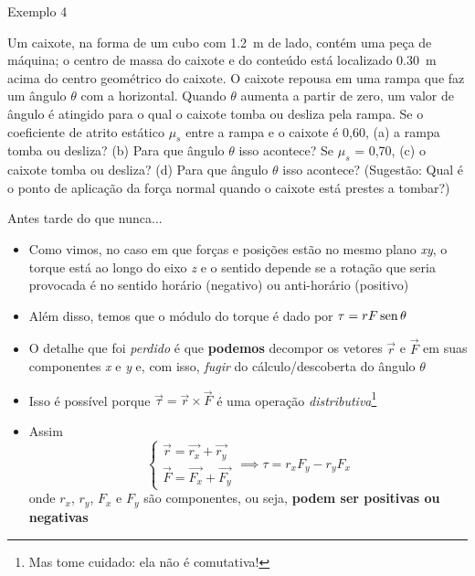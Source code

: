 
\begin{frame}{Exemplo 4}
    \begin{minipage}{\textwidth}
        Um caixote, na forma de um cubo com \SI{1,2}{m} de lado, contém uma peça de máquina; o centro de
        massa do caixote e do conteúdo está localizado \SI{0,30}{m} acima do centro geométrico do caixote. O caixote
        repousa em uma rampa que faz um ângulo \(\theta\) com a horizontal. Quando \(\theta\) aumenta a partir de zero, um
        valor de ângulo é atingido para o qual o caixote tomba ou desliza pela rampa. Se o coeficiente de atrito
        estático \(\mu_s\) entre a rampa e o caixote é 0,60, (a) a rampa tomba ou desliza? (b) Para que ângulo \(\theta\) isso
        acontece? Se \(\mu_s\) = 0,70, (c) o caixote tomba ou desliza? (d) Para que ângulo \(\theta\) isso acontece? (Sugestão:
        Qual é o ponto de aplicação da força normal quando o caixote está prestes a tombar?)
    \end{minipage}
\end{frame}

\begin{frame}{Antes tarde do que nunca...}
    \begin{itemize}
        \item Como vimos, no caso em que forças e posições estão no mesmo plano \textit{xy}, o torque
            está ao longo do eixo \textit{z} e o sentido depende se a rotação que seria provocada é
            no sentido horário (negativo) ou anti-horário (positivo)
        \item Além disso, temos que o módulo do torque é dado por \(\tau = r F \operatorname{sen}{\theta}\)
        \item O detalhe que foi \textit{perdido} é que \textbf{podemos} decompor os vetores \(\vec{r}\) e \(\vec{F}\)
            em suas componentes \textit{x} e \textit{y} e, com isso, \textit{fugir} do cálculo/descoberta do
            ângulo \(\theta\)
        \item Isso é possível porque \(\vec{\tau} = \vec{r} \times \vec{F}\) é uma operação
            \textit{distributiva}\footnote{Mas tome cuidado: ela não é comutativa!}
        \item Assim
            \[
                \begin{cases}
                    \vec{r}=\vec{r_x}+\vec{r_y}\\
                    \vec{F}=\vec{F_x}+\vec{F_y}
                \end{cases}
                \implies
                \tau = r_x  F_y - r_y  F_x
            \]
            onde \(r_x\), \(r_y\), \(F_x\) e \(F_y\) são componentes, ou seja, \textbf{podem ser positivas ou negativas}

    \end{itemize}
\end{frame}

